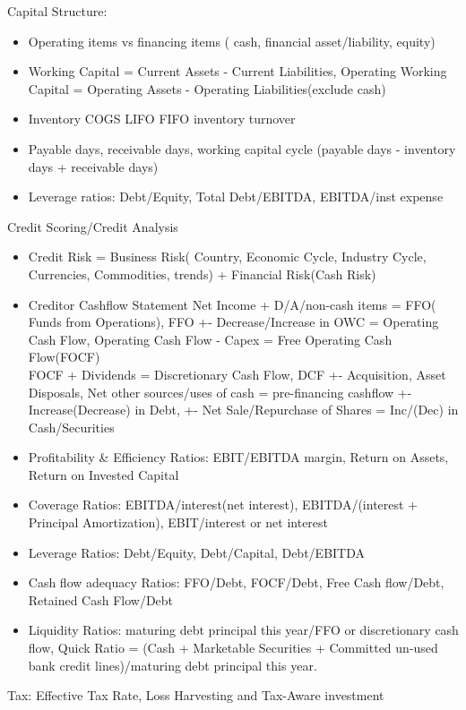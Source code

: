 \documentclass[11pt, openany]{book}              %
\begin{document}
Capital Structure:

\begin{itemize}
	\item Operating items vs financing items ( cash, financial asset/liability, equity)
	\item Working Capital = Current Assets - Current Liabilities, Operating Working Capital = Operating Assets - Operating Liabilities(exclude cash)
	\item Inventory COGS LIFO FIFO inventory turnover
	\item Payable days, receivable days, working capital cycle (payable days - inventory days + receivable days)
	\item Leverage ratios: Debt/Equity, Total Debt/EBITDA, EBITDA/inst expense	
\end{itemize}

Credit Scoring/Credit Analysis
\begin{itemize}
    \item Credit Risk = Business Risk( Country, Economic Cycle, Industry Cycle, Currencies, Commodities, trends) + Financial Risk(Cash Risk)
    \item Creditor Cashflow Statement Net Income + D/A/non-cash items = FFO( Funds from Operations), FFO +- Decrease/Increase in OWC = Operating Cash Flow, Operating Cash Flow - Capex = Free Operating Cash Flow(FOCF)\\ FOCF + Dividends = Discretionary Cash Flow, DCF +- Acquisition, Asset Disposals, Net other sources/uses of cash = pre-financing cashflow +- Increase(Decrease) in Debt, +- Net Sale/Repurchase of Shares = Inc/(Dec) in Cash/Securities
    \item Profitability \& Efficiency Ratios: EBIT/EBITDA margin, Return on Assets, Return on Invested Capital
    \item Coverage Ratios: EBITDA/interest(net interest), EBITDA/(interest + Principal Amortization), EBIT/interest or net interest
    \item Leverage Ratios: Debt/Equity, Debt/Capital, Debt/EBITDA
    \item Cash flow adequacy Ratios: FFO/Debt, FOCF/Debt, Free Cash flow/Debt, Retained Cash Flow/Debt
    \item Liquidity Ratios: maturing debt principal this year/FFO or discretionary cash flow, Quick Ratio = (Cash + Marketable Securities + Committed un-used bank credit lines)/maturing debt principal this year.
\end{itemize}

Tax:  Effective Tax Rate, Loss Harvesting and Tax-Aware investment 
\end{document}
